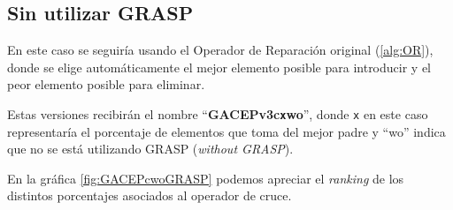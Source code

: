 \subsection{Sin utilizar GRASP}

En este caso se seguiría usando el Operador de Reparación original (\ref{alg:OR}), donde se elige automáticamente el mejor elemento posible para introducir y el peor elemento posible para eliminar.

Estas versiones recibirán el nombre ``\textbf{GACEPv3c\texttt{x}wo}'', donde \texttt{x} en este caso representaría el porcentaje de elementos que toma del mejor padre y ``wo'' indica que no se está utilizando GRASP (\textit{without GRASP}).

En la gráfica \ref{fig:GACEPcwoGRASP} podemos apreciar el \textit{ranking} de los distintos porcentajes asociados al operador de cruce.


